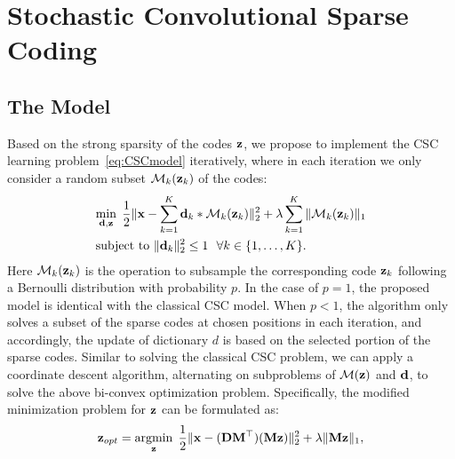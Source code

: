 \section{Stochastic Convolutional Sparse Coding}
\subsection{The Model}

Based on the strong sparsity of the codes $\code$, we propose to
implement the CSC learning problem~\eqref{eq:CSCmodel} iteratively,
where in each iteration we only consider a random subset
$\mathcal{M}_k(\code_k)$ of the codes:
\begin{align}
    &\mini{\filter,\code}  \frac{1}{2}\|\signal - \sum_{k=1}^{K} \filter_k * \mathcal{M}_k(\code_k) \|_2^2 + \lambda \sum_{k=1}^{K}\| \mathcal{M}_k(\code_k) \|_1  \nonumber \\
    &\text{subject to} ~ \|\filter_k\|^2_2 \leq 1 ~~ \forall k \in \{1,\dots,K\}.
\end{align}
Here $\mathcal{M}_k(\code_k)$ is the operation to subsample the
corresponding code $\code_k$ following a Bernoulli distribution with
probability $p$.
In the case of $p=1$, the proposed model is identical with the
classical CSC model. When $p<1$, the algorithm only solves a subset of
the sparse codes at chosen positions in each iteration, and
accordingly, the update of dictionary $d$ is based on the selected
portion of the sparse codes. Similar to solving the classical CSC
problem, we can apply a coordinate descent algorithm, alternating on
subproblems of $\mathcal{M}(\code)$ and $\filter$, to solve the above
bi-convex optimization problem. Specifically, the modified
minimization problem for $\code$ can be formulated as:
\begin{equation} \label{eq:updatingCode}
    \code_{opt} = \minimize{\code} \frac{1}{2}\|\signal - (\Filter \mask^\top)(\mask \code) \|_2^2 + \lambda \|\mask \code\|_1,
\end{equation}
